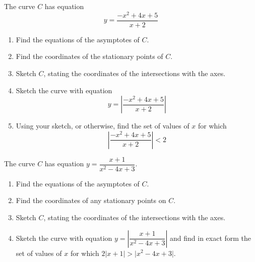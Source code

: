 \documentclass[leqno]{article}
\begin{document}
\begin{enumerate}[
  label=\textbf{\arabic*.},
  leftmargin=*,
  topsep=0pt,
  partopsep=0pt,
  parsep=0pt
]
\newpage

\questionitem

The curve $C$ has equation
\[
y=\dfrac{-x^2+4x+5}{x+2}
\]
\begin{enumerate}[label=\textbf{(\alph*)}]
  \item Find the equations of the asymptotes of $C$.  \\
  \item Find the coordinates of the stationary points of $C$.  \\
  \item Sketch $C$, stating the coordinates of the intersections with the axes.  \\
  \item Sketch the curve with equation
  \[
  y=\left|\dfrac{-x^2+4x+5}{x+2}\right|
  \]
  \item Using your sketch, or otherwise, find the set of values of $x$ for which
  \[
  \left|\dfrac{-x^2+4x+5}{x+2}\right|<2
  \]
\end{enumerate}

\newpage

\questionitem

The curve $C$ has equation $y = \dfrac{x+1}{x^2-4x+3}$. \\
\begin{enumerate}[label=\textbf{(\alph*)}]
  \item Find the equations of the asymptotes of $C$.  \\
  \item Find the coordinates of any stationary points on $C$.  \\
  \item Sketch $C$, stating the coordinates of the intersections with the axes.  \\
  \item Sketch the curve with equation $y = \left|\dfrac{x+1}{x^2-4x+3}\right|$ and find in exact form the set of values of $x$ for which $2\lvert x+1\rvert > \lvert x^2-4x+3\rvert$.  \\
\end{enumerate}

\newpage

\questionitem


\end{enumerate}
\end{document}
